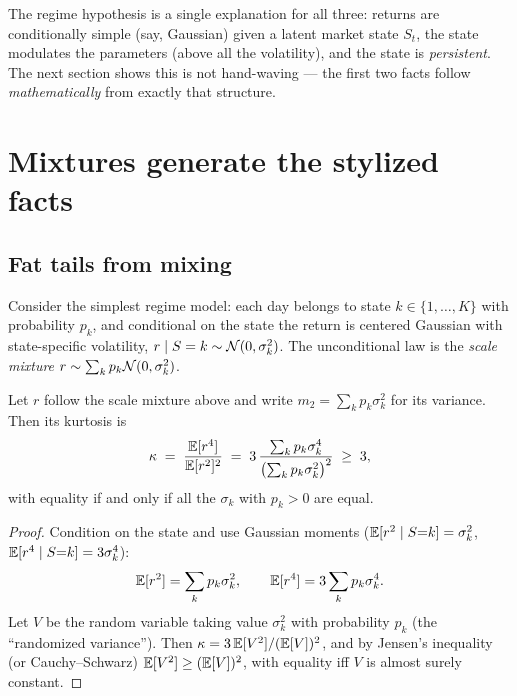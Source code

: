 The regime hypothesis is a single explanation for all three: returns are
conditionally simple (say, Gaussian) given a latent market state $S_t$, the
state modulates the parameters (above all the volatility), and the state is
\emph{persistent}. The next section shows this is not hand-waving --- the
first two facts follow \emph{mathematically} from exactly that structure.

\section{Mixtures generate the stylized facts}\label{sec:mixmath}

\subsection{Fat tails from mixing}

Consider the simplest regime model: each day belongs to state
$k \in \{1, \dots, K\}$ with probability $p_k$, and conditional on the state
the return is centered Gaussian with state-specific volatility,
$r \mid S = k \sim \mathcal{N}(0, \sigma_k^2)$. The unconditional law is the
\emph{scale mixture} $r \sim \sum_k p_k \mathcal{N}(0, \sigma_k^2)$.

\begin{proposition}\label{prop:kurtosis}
Let $r$ follow the scale mixture above and write
$m_2 = \sum_k p_k \sigma_k^2$ for its variance. Then its kurtosis is
\[
  \kappa \;=\; \frac{\mathbb{E}[r^4]}{\mathbb{E}[r^2]^2}
  \;=\; 3\,\frac{\sum_k p_k \sigma_k^4}{\bigl(\sum_k p_k \sigma_k^2\bigr)^2}
  \;\geq\; 3,
\]
with equality if and only if all the $\sigma_k$ with $p_k > 0$ are equal.
\end{proposition}

\begin{proof}
Condition on the state and use Gaussian moments
($\mathbb{E}[r^2 \mid S{=}k] = \sigma_k^2$, $\mathbb{E}[r^4 \mid S{=}k] = 3\sigma_k^4$):
\[
  \mathbb{E}[r^2] = \sum_k p_k \sigma_k^2, \qquad
  \mathbb{E}[r^4] = 3 \sum_k p_k \sigma_k^4 .
\]
Let $V$ be the random variable taking value $\sigma_k^2$ with probability
$p_k$ (the ``randomized variance''). Then
$\kappa = 3\,\mathbb{E}[V^2] / (\mathbb{E}[V])^2$, and by Jensen's inequality (or
Cauchy--Schwarz) $\mathbb{E}[V^2] \ge (\mathbb{E}[V])^2$, with equality iff $V$ is almost
surely constant.
\end{proof}

